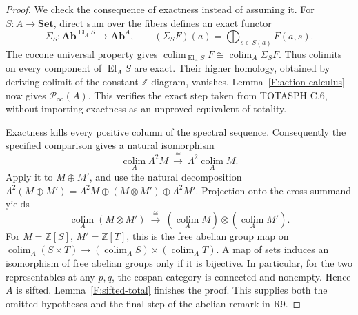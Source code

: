 \documentclass[11pt,a4paper]{article}
\theoremstyle{definition}
\theoremstyle{remark}
\newcommand{\Set}{\mathbf{Set}}
\newcommand{\Ab}{\mathbf{Ab}}
\newcommand{\El}{\operatorname{El}}
\newcommand{\colim}{\operatorname*{colim}}
\begin{document}
\begin{proof}
We check the consequence of exactness instead of assuming it.
For $S:A\to\Set$, direct sum over the fibers defines an exact functor
\[
 \Sigma_S:\Ab^{\El_A S}\to\Ab^A,
 \qquad (\Sigma_S F)(a)=\bigoplus_{s\in S(a)}F(a,s).
\]
The cocone universal property gives
$\colim_{\El_A S}F\cong\colim_A\Sigma_S F$.
Thus colimits on every component of $\El_A S$ are exact.
Their higher homology, obtained by deriving colimit of the constant
$\mathbb Z$ diagram, vanishes.  Lemma~\ref{F:action-calculus} now
gives $\mathcal P_\infty(A)$.  This verifies the exact step taken
from TOTASPH C.6, without importing exactness as an unproved equivalent
of totality.

Exactness kills every positive column of the spectral sequence.
Consequently the specified comparison gives a natural isomorphism
\[
 \colim_A\Lambda^2M\ \xrightarrow{\cong}\
 \Lambda^2\colim_A M.
\]
Apply it to $M\oplus M'$, and use the natural decomposition
$\Lambda^2(M\oplus M')=\Lambda^2M\oplus(M\otimes M')\oplus\Lambda^2M'$.
Projection onto the cross summand yields
\[
 \colim_A(M\otimes M')\ \xrightarrow{\cong}\
 (\colim_A M)\otimes(\colim_A M').
\]
For $M=\mathbb Z[S]$, $M'=\mathbb Z[T]$, this is the free abelian
group map on
$\colim_A(S\times T)\to(\colim_A S)\times(\colim_A T)$.
A map of sets induces an isomorphism of free abelian groups only if
it is bijective.  In particular, for the two representables at any
$p,q$, the cospan category is connected and nonempty.  Hence $A$ is
sifted.  Lemma~\ref{F:sifted-total} finishes the proof.
This supplies both the omitted hypotheses and the final step of
the abelian remark in R9.
\end{proof}
\end{document}
